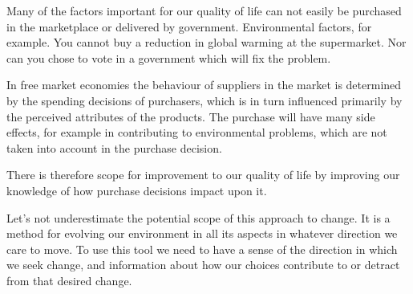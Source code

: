Many of the factors important for our quality of life can not easily be purchased in the marketplace or delivered by government.
Environmental factors, for example.
You cannot buy a reduction in global warming at the supermarket.
Nor can you chose to vote in a government which will fix the problem.

In free market economies the behaviour of suppliers in the market is determined by the spending decisions of purchasers, which is in turn influenced primarily by the perceived attributes of the products.
The purchase will have many side effects, for example in contributing to environmental problems, which are not taken into account in the purchase decision.

There is therefore scope for improvement to our quality of life by improving our knowledge of how purchase decisions impact upon it.

Let's not underestimate the potential scope of this approach to change.
It is a method for evolving our environment in all its aspects in whatever direction we care to move.
To use this tool we need to have a sense of the direction in which we seek change, and information about how our choices contribute to or detract from that desired change.